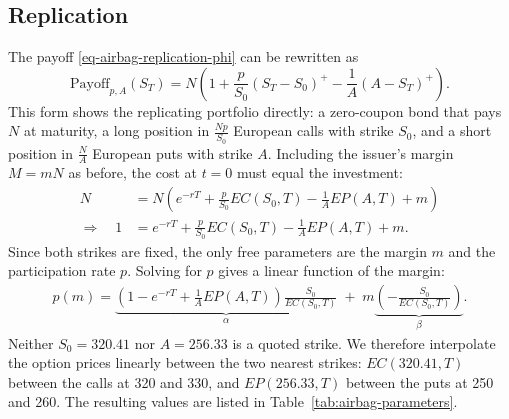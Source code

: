 \subsection{Replication}
The payoff \eqref{eq-airbag-replication-phi} can be rewritten as
\[
    \text{Payoff}_{p, A}(S_T)
    = N \left( 1 + \frac{p}{S_0} (S_T - S_0)^+ - \frac{1}{A} (A - S_T)^+\right).
\]
This form shows the replicating portfolio directly: a zero-coupon bond that pays $N$ at maturity, a long position in $\frac{Np}{S_0}$ European calls with strike $S_0$, and a short position in $\frac{N}{A}$ European puts with strike $A$.
Including the issuer's margin $M = mN$ as before, the cost at $t = 0$ must equal the investment:
\begin{align*}
    N &= N \left( e^{-rT} + \frac{p}{S_0} EC(S_0, T) - \frac{1}{A} EP(A, T) + m \right) \\
    \Rightarrow \quad 1 &= e^{-rT} + \frac{p}{S_0} EC(S_0, T) - \frac{1}{A} EP(A, T) + m.
\end{align*}
Since both strikes are fixed, the only free parameters are the margin $m$ and the participation rate $p$.
Solving for $p$ gives a linear function of the margin:
\begin{align}
    p(m)
    = \underbrace{\left( 1 - e^{-rT} + \frac{1}{A} EP(A,T) \right) \frac{S_0}{EC(S_0,T)}}_{\alpha}
    \;+\;
    m \underbrace{\left( - \frac{S_0}{EC(S_0,T)} \right)}_{\beta}.
\end{align}
Neither $S_0 = 320.41$ nor $A = 256.33$ is a quoted strike.
We therefore interpolate the option prices linearly between the two nearest strikes: $EC(320.41, T)$ between the calls at 320 and 330, and $EP(256.33, T)$ between the puts at 250 and 260.
The resulting values are listed in Table~\ref{tab:airbag-parameters}.

